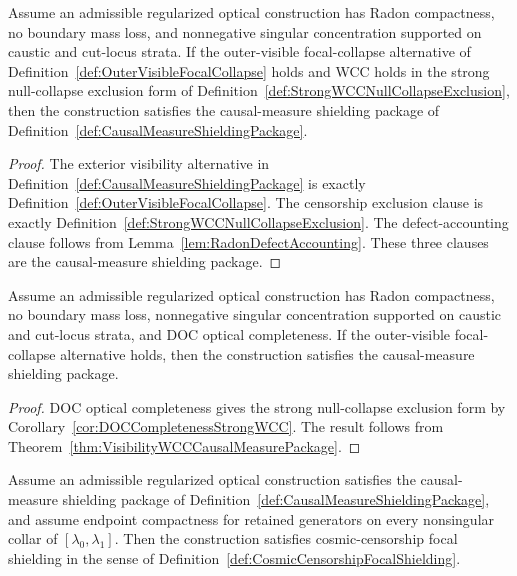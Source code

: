 \begin{theorem}\label{thm:VisibilityWCCCausalMeasurePackage}
Assume an admissible regularized optical construction has Radon compactness, no boundary mass loss, and nonnegative singular concentration supported on caustic and cut-locus strata. If the outer-visible focal-collapse alternative of Definition~\ref{def:OuterVisibleFocalCollapse} holds and WCC holds in the strong null-collapse exclusion form of Definition~\ref{def:StrongWCCNullCollapseExclusion}, then the construction satisfies the causal-measure shielding package of Definition~\ref{def:CausalMeasureShieldingPackage}.
\end{theorem}

\begin{proof}
The exterior visibility alternative in Definition~\ref{def:CausalMeasureShieldingPackage} is exactly Definition~\ref{def:OuterVisibleFocalCollapse}. The censorship exclusion clause is exactly Definition~\ref{def:StrongWCCNullCollapseExclusion}. The defect-accounting clause follows from Lemma~\ref{lem:RadonDefectAccounting}. These three clauses are the causal-measure shielding package.
\end{proof}

\begin{corollary}\label{cor:DOCCompletenessCausalMeasurePackage}
Assume an admissible regularized optical construction has Radon compactness, no boundary mass loss, nonnegative singular concentration supported on caustic and cut-locus strata, and DOC optical completeness. If the outer-visible focal-collapse alternative holds, then the construction satisfies the causal-measure shielding package.
\end{corollary}

\begin{proof}
DOC optical completeness gives the strong null-collapse exclusion form by Corollary~\ref{cor:DOCCompletenessStrongWCC}. The result follows from Theorem~\ref{thm:VisibilityWCCCausalMeasurePackage}.
\end{proof}

\begin{theorem}\label{thm:CausalMeasureShieldingFocalShielding}
Assume an admissible regularized optical construction satisfies the causal-measure shielding package of Definition~\ref{def:CausalMeasureShieldingPackage}, and assume endpoint compactness for retained generators on every nonsingular collar of $[\lambda_0,\lambda_1]$. Then the construction satisfies cosmic-censorship focal shielding in the sense of Definition~\ref{def:CosmicCensorshipFocalShielding}.
\end{theorem}

